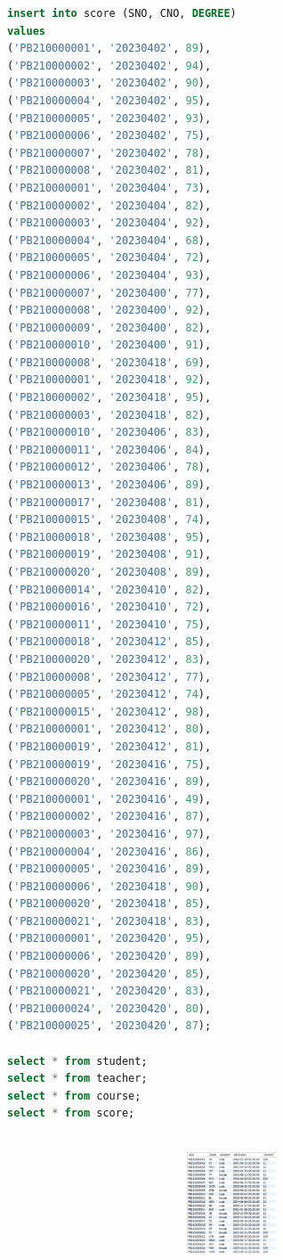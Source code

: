 \documentclass{ctexart}
\begin{document}
\begin{lstlisting}[language=sql]
insert into score (SNO, CNO, DEGREE)
values
('PB210000001', '20230402', 89),
('PB210000002', '20230402', 94),
('PB210000003', '20230402', 90),
('PB210000004', '20230402', 95),
('PB210000005', '20230402', 93),
('PB210000006', '20230402', 75),
('PB210000007', '20230402', 78),
('PB210000008', '20230402', 81),
('PB210000001', '20230404', 73),
('PB210000002', '20230404', 82),
('PB210000003', '20230404', 92),
('PB210000004', '20230404', 68),
('PB210000005', '20230404', 72),
('PB210000006', '20230404', 93),
('PB210000007', '20230400', 77),
('PB210000008', '20230400', 92),
('PB210000009', '20230400', 82),
('PB210000010', '20230400', 91),
('PB210000008', '20230418', 69),
('PB210000001', '20230418', 92),
('PB210000002', '20230418', 95),
('PB210000003', '20230418', 82),
('PB210000010', '20230406', 83),
('PB210000011', '20230406', 84),
('PB210000012', '20230406', 78),
('PB210000013', '20230406', 89),
('PB210000017', '20230408', 81),
('PB210000015', '20230408', 74),
('PB210000018', '20230408', 95),
('PB210000019', '20230408', 91),
('PB210000020', '20230408', 89),
('PB210000014', '20230410', 82),
('PB210000016', '20230410', 72),
('PB210000011', '20230410', 75),
('PB210000018', '20230412', 85),
('PB210000020', '20230412', 83),
('PB210000008', '20230412', 77),
('PB210000005', '20230412', 74),
('PB210000015', '20230412', 98),
('PB210000001', '20230412', 80),
('PB210000019', '20230412', 81),
('PB210000019', '20230416', 75),
('PB210000020', '20230416', 89),
('PB210000001', '20230416', 49),
('PB210000002', '20230416', 87),
('PB210000003', '20230416', 97),
('PB210000004', '20230416', 86),
('PB210000005', '20230416', 89),
('PB210000006', '20230418', 90),
('PB210000020', '20230418', 85),
('PB210000021', '20230418', 83),
('PB210000001', '20230420', 95),
('PB210000006', '20230420', 89),
('PB210000020', '20230420', 85),
('PB210000021', '20230420', 83),
('PB210000024', '20230420', 80),
('PB210000025', '20230420', 87);

select * from student;  
select * from teacher;  
select * from course;  
select * from score;  
  
	\end{lstlisting}
	\begin{figure}[H]
		\centering 
		\includegraphics[height=3cm,width=14cm]{2.png}
		\end{figure}
\end{document}
